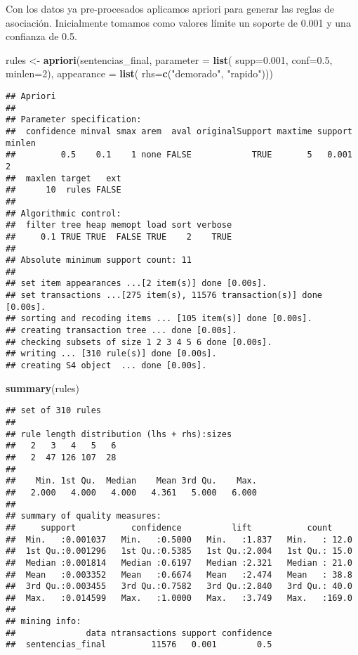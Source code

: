\documentclass[runningheads,a4paper]{llncs}
\newenvironment{Shaded}{\footnotesize}{}
\newcommand{\KeywordTok}[1]{\textcolor[rgb]{0.00,0.44,0.13}{\textbf{{#1}}}}
\newcommand{\DataTypeTok}[1]{\textcolor[rgb]{0.56,0.13,0.00}{{#1}}}
\newcommand{\DecValTok}[1]{\textcolor[rgb]{0.25,0.63,0.44}{{#1}}}
\newcommand{\FloatTok}[1]{\textcolor[rgb]{0.25,0.63,0.44}{{#1}}}
\newcommand{\StringTok}[1]{\textcolor[rgb]{0.25,0.44,0.63}{{#1}}}
\newcommand{\NormalTok}[1]{{#1}}
\begin{document}
Con los datos ya pre-procesados aplicamos apriori para generar las
reglas de asociación. Inicialmente tomamos como valores límite un
soporte de 0.001 y una confianza de 0.5.

\scriptsize

\begin{Shaded}
\begin{Highlighting}[]
\NormalTok{rules <-}\StringTok{ }\KeywordTok{apriori}\NormalTok{(sentencias_final, }\DataTypeTok{parameter =} \KeywordTok{list}\NormalTok{(}
  \DataTypeTok{supp=}\FloatTok{0.001}\NormalTok{, }\DataTypeTok{conf=}\FloatTok{0.5}\NormalTok{, }\DataTypeTok{minlen=}\DecValTok{2}\NormalTok{), }\DataTypeTok{appearance =} \KeywordTok{list}\NormalTok{(}
    \DataTypeTok{rhs=}\KeywordTok{c}\NormalTok{(}\StringTok{"demorado"}\NormalTok{, }\StringTok{"rapido"}\NormalTok{)))}
\end{Highlighting}
\end{Shaded}

\begin{verbatim}
## Apriori
## 
## Parameter specification:
##  confidence minval smax arem  aval originalSupport maxtime support minlen
##         0.5    0.1    1 none FALSE            TRUE       5   0.001      2
##  maxlen target   ext
##      10  rules FALSE
## 
## Algorithmic control:
##  filter tree heap memopt load sort verbose
##     0.1 TRUE TRUE  FALSE TRUE    2    TRUE
## 
## Absolute minimum support count: 11 
## 
## set item appearances ...[2 item(s)] done [0.00s].
## set transactions ...[275 item(s), 11576 transaction(s)] done [0.00s].
## sorting and recoding items ... [105 item(s)] done [0.00s].
## creating transaction tree ... done [0.00s].
## checking subsets of size 1 2 3 4 5 6 done [0.00s].
## writing ... [310 rule(s)] done [0.00s].
## creating S4 object  ... done [0.00s].
\end{verbatim}

\begin{Shaded}
\begin{Highlighting}[]
\KeywordTok{summary}\NormalTok{(rules)}
\end{Highlighting}
\end{Shaded}

\begin{verbatim}
## set of 310 rules
## 
## rule length distribution (lhs + rhs):sizes
##   2   3   4   5   6 
##   2  47 126 107  28 
## 
##    Min. 1st Qu.  Median    Mean 3rd Qu.    Max. 
##   2.000   4.000   4.000   4.361   5.000   6.000 
## 
## summary of quality measures:
##     support           confidence          lift           count      
##  Min.   :0.001037   Min.   :0.5000   Min.   :1.837   Min.   : 12.0  
##  1st Qu.:0.001296   1st Qu.:0.5385   1st Qu.:2.004   1st Qu.: 15.0  
##  Median :0.001814   Median :0.6197   Median :2.321   Median : 21.0  
##  Mean   :0.003352   Mean   :0.6674   Mean   :2.474   Mean   : 38.8  
##  3rd Qu.:0.003455   3rd Qu.:0.7582   3rd Qu.:2.840   3rd Qu.: 40.0  
##  Max.   :0.014599   Max.   :1.0000   Max.   :3.749   Max.   :169.0  
## 
## mining info:
##              data ntransactions support confidence
##  sentencias_final         11576   0.001        0.5
\end{verbatim}
\end{document}

